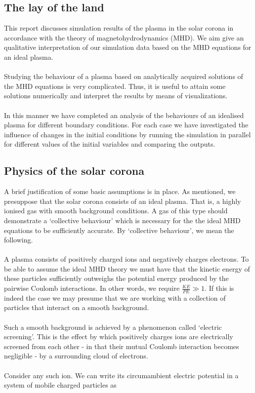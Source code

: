 

\subsection*{The lay of the land}

This report discusses simulation results of the plasma in the solar corona in accordance with the theory of magnetohydrodynamics (MHD). We aim give an qualitative interpretation of our simulation data based on the MHD equations for an ideal plasma.\\
\\
Studying the behaviour of a plasma based on analytically acquired solutions of the MHD equations is very complicated. Thus, it is useful to attain some solutions numerically and interpret the results by means of visualizations.\\
\\
In this manner we have completed an analysis of the behaviours of an idealised plasma for different boundary conditions. For each case we have investigated the influence of changes in the initial conditions by running the simulation in parallel for different values of the initial variables and comparing the outputs. 

\subsection*{Physics of the solar corona}

A brief justification of some basic assumptions is in place. As mentioned, we presuppose that the solar corona consists of an ideal plasma. That is, a highly ionised gas with smooth background conditions. A gas of this type should demonstrate a `collective behaviour' which is necessary for the the ideal MHD equations to be sufficiently accurate. By `collective behaviour', we mean the following.\\
\\
A plasma consists of positively charged ions and negatively charges electrons. To be able to assume the ideal MHD theory we must have that the kinetic energy of these particles sufficiently outweighs the potential energy produced by the pairwise Coulomb interactions. In other words, we require $\frac{KE}{PE} \gg 1$. If this is indeed the case we may presume that we are working with a collection of particles that interact on a smooth background.\\
\\
Such a smooth background is achieved by a phenomenon called `electric screening'. This is the effect by which positively charges ions are electrically screened from each other - in that their mutual Coulomb interaction becomes negligible - by a surrounding cloud of electrons.\\
\\
Consider any such ion. We can write its circumambient electric potential in a system of mobile charged particles as 

